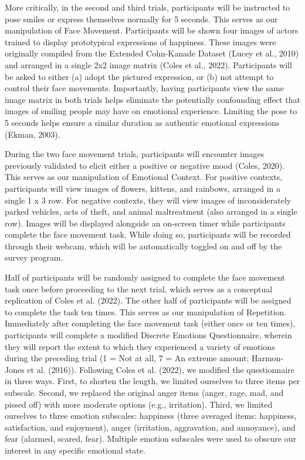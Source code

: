 \documentclass[
  letterpaper,
  DIV=11,
  numbers=noendperiod]{scrartcl}
\begin{document}
More critically, in the second and third trials, participants will be
instructed to pose smiles or express themselves normally for 5 seconds.
This serves as our manipulation of Face Movement. Participants will be
shown four images of actors trained to display prototypical expressions
of happiness. These images were originally compiled from the Extended
Cohn-Kanade Dataset (Lucey et al., 2010) and arranged in a single 2x2
image matrix ({Coles et al.}, 2022). Participants will be asked to
either (a) adopt the pictured expression, or (b) not attempt to control
their face movements. Importantly, having participants view the same
image matrix in both trials helps eliminate the potentially confounding
effect that images of smiling people may have on emotional experience.
Limiting the pose to 5 seconds helps ensure a similar duration as
authentic emotional expressions (Ekman, 2003).

During the two face movement trials, participants will encounter images
previously validated to elicit either a positive or negative mood
(Coles, 2020). This serves as our manipulation of Emotional Context. For
positive contexts, participants will view images of flowers, kittens,
and rainbows, arranged in a single 1 x 3 row. For negative contexts,
they will view images of inconsiderately parked vehicles, acts of theft,
and animal maltreatment (also arranged in a single row). Images will be
displayed alongside an on-screen timer while participants complete the
face movement task. While doing so, participants will be recorded
through their webcam, which will be automatically toggled on and off by
the survey program.

Half of participants will be randomly assigned to complete the face
movement task once before proceeding to the next trial, which serves as
a conceptual replication of Coles et al. (2022). The other half of
participants will be assigned to complete the task ten times. This
serves as our manipulation of Repetition. Immediately after completing
the face movement task (either once or ten times), participants will
complete a modified Discrete Emotions Questionnaire, wherein they will
report the extent to which they experienced a variety of emotions during
the preceding trial (1 = Not at all, 7 = An extreme amount; Harmon-Jones
et al. (2016)). Following Coles et al. (2022), we modified the
questionnaire in three ways. First, to shorten the length, we limited
ourselves to three items per subscale. Second, we replaced the original
anger items (anger, rage, mad, and pissed off) with more moderate
options (e.g., irritation). Third, we limited ourselves to three emotion
subscales: happiness (three averaged items: happiness, satisfaction, and
enjoyment), anger (irritation, aggravation, and annoyance), and fear
(alarmed, scared, fear). Multiple emotion subscales were used to obscure
our interest in any specific emotional state.
\end{document}
